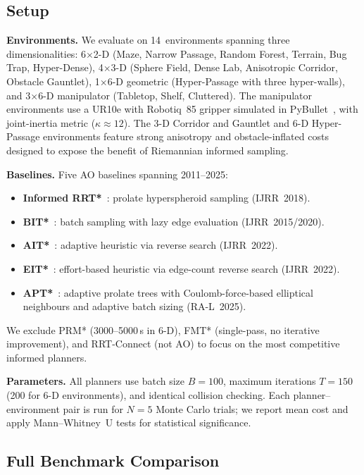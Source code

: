 \documentclass[journal]{IEEEtran}
\begin{document}
\subsection{Setup}

\textbf{Environments.}
We evaluate on 14~environments spanning three dimensionalities:
6$\times$2-D (Maze, Narrow Passage, Random Forest, Terrain, Bug Trap,
Hyper-Dense),
4$\times$3-D (Sphere Field, Dense Lab, Anisotropic Corridor,
Obstacle Gauntlet),
1$\times$6-D geometric (Hyper-Passage with three hyper-walls), and
3$\times$6-D manipulator (Tabletop, Shelf, Cluttered). The
manipulator environments use a UR10e with Robotiq~85 gripper simulated
in PyBullet~\cite{Coumans2021}, with joint-inertia metric
($\kappa \approx 12$). The 3-D Corridor and Gauntlet and 6-D
Hyper-Passage environments feature strong anisotropy and
obstacle-inflated costs designed to expose the benefit of Riemannian
informed sampling.

\textbf{Baselines.}
Five AO baselines spanning 2011--2025:
\begin{itemize}
  \item \textbf{Informed RRT*}~\cite{Gammell2018}: prolate
    hyperspheroid sampling (IJRR~2018).
  \item \textbf{BIT*}~\cite{Gammell2020}: batch sampling with lazy
    edge evaluation (IJRR~2015/2020).
  \item \textbf{AIT*}~\cite{Strub2022}: adaptive heuristic via
    reverse search (IJRR~2022).
  \item \textbf{EIT*}~\cite{Strub2022}: effort-based heuristic
    via edge-count reverse search (IJRR~2022).
  \item \textbf{APT*}~\cite{APT2025}: adaptive prolate trees with
    Coulomb-force-based elliptical neighbours and adaptive batch sizing
    (RA-L~2025).
\end{itemize}
We exclude PRM* (3000--5000\,s in 6-D), FMT* (single-pass, no
iterative improvement), and RRT-Connect (not AO) to focus on the most
competitive informed planners.

\textbf{Parameters.}
All planners use batch size $B = 100$, maximum iterations $T = 150$
(200 for 6-D environments), and identical collision checking. Each
planner--environment pair is run for $N = 5$ Monte Carlo
trials; we report mean cost and apply Mann--Whitney~U tests for
statistical significance.

\subsection{Full Benchmark Comparison}
\end{document}
